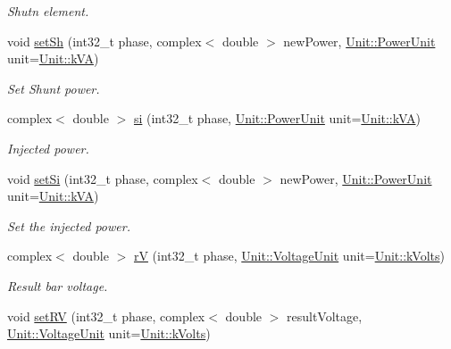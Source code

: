 \begin{DoxyCompactItemize}
\begin{DoxyCompactList}\small\item\em Shutn element. \end{DoxyCompactList}\item 
void \hyperlink{group___models_ga207abd3d0649a488e3c44cf2a501ed23}{set\+Sh} (int32\+\_\+t phase, complex$<$ double $>$ new\+Power, \hyperlink{class_unit_ace265ae255370ccacfd5370337572c3b}{Unit\+::\+Power\+Unit} unit=\hyperlink{class_unit_ace265ae255370ccacfd5370337572c3ba72b181a842ae2759488a2fa1410d3696}{Unit\+::k\+V\+A})
\begin{DoxyCompactList}\small\item\em Set Shunt power. \end{DoxyCompactList}\item 
complex$<$ double $>$ \hyperlink{group___models_ga02bbc279f1e133f66b12ee21e7bebcd8}{si} (int32\+\_\+t phase, \hyperlink{class_unit_ace265ae255370ccacfd5370337572c3b}{Unit\+::\+Power\+Unit} unit=\hyperlink{class_unit_ace265ae255370ccacfd5370337572c3ba72b181a842ae2759488a2fa1410d3696}{Unit\+::k\+V\+A})
\begin{DoxyCompactList}\small\item\em Injected power. \end{DoxyCompactList}\item 
void \hyperlink{group___models_ga74e510be49e50e4c14550b32e1dc92f9}{set\+Si} (int32\+\_\+t phase, complex$<$ double $>$ new\+Power, \hyperlink{class_unit_ace265ae255370ccacfd5370337572c3b}{Unit\+::\+Power\+Unit} unit=\hyperlink{class_unit_ace265ae255370ccacfd5370337572c3ba72b181a842ae2759488a2fa1410d3696}{Unit\+::k\+V\+A})
\begin{DoxyCompactList}\small\item\em Set the injected power. \end{DoxyCompactList}\item 
complex$<$ double $>$ \hyperlink{group___models_ga2d1f6bfbd8abaf168bb75bd8e5cd9b5e}{r\+V} (int32\+\_\+t phase, \hyperlink{class_unit_a55b07dfa9457e1eca2c7194fe0cfc3c1}{Unit\+::\+Voltage\+Unit} unit=\hyperlink{class_unit_a55b07dfa9457e1eca2c7194fe0cfc3c1aa54b2473993a702a3923525765bd6e4c}{Unit\+::k\+Volts})
\begin{DoxyCompactList}\small\item\em Result bar voltage. \end{DoxyCompactList}\item 
void \hyperlink{group___models_ga2b2c5a373d87025e79d26aa9c4cea75a}{set\+R\+V} (int32\+\_\+t phase, complex$<$ double $>$ result\+Voltage, \hyperlink{class_unit_a55b07dfa9457e1eca2c7194fe0cfc3c1}{Unit\+::\+Voltage\+Unit} unit=\hyperlink{class_unit_a55b07dfa9457e1eca2c7194fe0cfc3c1aa54b2473993a702a3923525765bd6e4c}{Unit\+::k\+Volts})

\end{DoxyCompactItemize}
